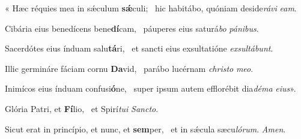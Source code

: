 \item « Hæc réquies mea in sǽculum \textbf{sǽ}culi;~\psstar{} hic habitábo, quóniam deside\textit{rávi} \textit{eam}.

\item Cibária eius benedícens bene\textbf{dí}cam,~\psstar{} páuperes eius saturá\textit{bo} \textit{pánibus}.

\item Sacerdótes eius índuam salu\textbf{tá}ri,~\psstar{} et sancti eius exsultatióne \textit{exsultábunt}.

\item Illic germináre fáciam cornu \textbf{Da}vid,~\psstar{} parábo lucérnam \textit{christo} \textit{meo}.

\item Inimícos eius índuam confusi\textbf{ó}ne,~\psstar{} super ipsum autem efflorébit dia\textit{déma} \textit{eius}».

\item Glória Patri, et \textbf{Fí}lio,~\psstar{} et Spirí\textit{tui} \textit{Sancto}.

\item Sicut erat in princípio, et nunc, et \textbf{sem}per,~\psstar{} et in sǽcula sæcu\textit{lórum}. \textit{Amen}.